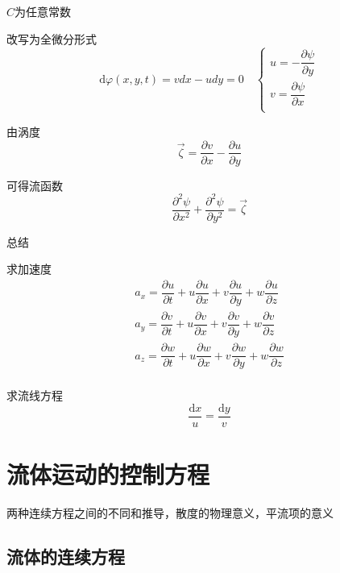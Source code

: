 \documentclass[a4paper,oneside]{ctexbook}
\begin{document}
\(C\)为任意常数

改写为全微分形式
\begin{equation}
\mathrm{d}\varphi(x,y,t)=vdx-udy=0\quad
\left\{
\begin{array}{l}
    u=-\dfrac{\partial{\psi}}{\partial{y}}\\
    v=\dfrac{\partial{\psi}}{\partial{x}}\\
\end{array}
\right.
\end{equation}

由涡度
\begin{equation}
    \overrightarrow{\zeta}=\dfrac{\partial{v}}{\partial{x}}-\dfrac{\partial{u}}{\partial{y}}
\end{equation}

可得流函数
\begin{equation}
    \dfrac{\partial^2\psi}{\partial{x^2}}+\dfrac{\partial^2\psi}{\partial{y^2}}=\overrightarrow{\zeta}
\end{equation}

总结

求加速度
\begin{equation}
\begin{array}{c}
    a_x=\dfrac{\partial{u}}{\partial{t}}+u\dfrac{\partial{u}}{\partial{x}}+v\dfrac{\partial{u}}{\partial{y}}+w\dfrac{\partial{u}}{\partial{z}}\\
    a_y=\dfrac{\partial{v}}{\partial{t}}+u\dfrac{\partial{v}}{\partial{x}}+v\dfrac{\partial{v}}{\partial{y}}+w\dfrac{\partial{v}}{\partial{z}}\\
    a_z=\dfrac{\partial{w}}{\partial{t}}+u\dfrac{\partial{w}}{\partial{x}}+v\dfrac{\partial{w}}{\partial{y}}+w\dfrac{\partial{w}}{\partial{z}}\\
\end{array}
\end{equation}

求流线方程
\begin{equation}
    \dfrac{\mathrm{d}x}{u}=\dfrac{\mathrm{d}y}{v}
\end{equation}

\chapter{流体运动的控制方程}

两种连续方程之间的不同和推导，散度的物理意义，平流项的意义

\section{流体的连续方程}
\end{document}
